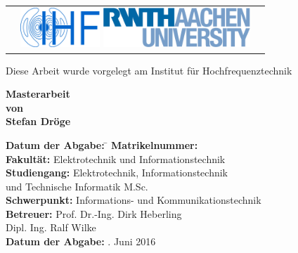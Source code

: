
\thispagestyle{empty}
 
\makeatletter
\begin{titlepage}

\begin{tabularx}{1.1\textwidth}{Xrr}
  & \includegraphics[height=1.5cm]{figures/ihflogoblau2001.jpg} \hspace{0.5cm}
\includegraphics[height=1.5cm]{figures/RWTHAachenUniversity.jpg}	 \\ 
\end{tabularx}

\begin{flushleft}
Diese Arbeit wurde vorgelegt am Institut für Hochfrequenztechnik
\end{flushleft}
\vspace{2cm}

\begin{center}

\textbf{\Huge
\@title
\vfill
\LARGE Masterarbeit\\
\vspace{0,5cm}
\LARGE von\\
\vspace{1cm}
\LARGE Stefan Dröge}
\vfill
\large
\vfill
 \begin{tabbing}
  \textbf{Datum der Abgabe:} \hspace*{1cm}\= \kill      %
  \textbf{Matrikelnummer:}			\\
  \textbf{Fakultät:}				\> Elektrotechnik und Informationstechnik\\
  \textbf{Studiengang:}				\> Elektrotechnik, Informationstechnik \\
                                    \> und Technische Informatik M.Sc.\\
  \textbf{Schwerpunkt:}             \> Informations- und Kommunikationstechnik\\
  \textbf{Betreuer:}  	  			\> Prof. Dr.-Ing. Dirk Heberling\\
                                    \> Dipl. Ing. Ralf Wilke\\
  \textbf{Datum der Abgabe:}		. Juni 2016
 \end{tabbing}
 
\end{center}
\end{titlepage}
\makeatother

\endinput

\maketitle
